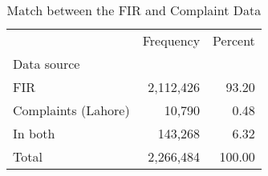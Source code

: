 \begin{table}[!h]
\caption{Match between the FIR and Complaint Data}
\centering
\begin{tabular}{lll}
\cline{1-3}
\multicolumn{1}{c}{} &
  \multicolumn{1}{|r}{Frequency} &
  \multicolumn{1}{r}{Percent} \\
\cline{1-3}
\multicolumn{1}{l}{Data source} &
  \multicolumn{1}{|r}{} &
  \multicolumn{1}{r}{} \\
\multicolumn{1}{l}{\hspace{1em}FIR} &
  \multicolumn{1}{|r}{2,112,426} &
  \multicolumn{1}{r}{93.20} \\
\multicolumn{1}{l}{\hspace{1em}Complaints (Lahore)} &
  \multicolumn{1}{|r}{10,790} &
  \multicolumn{1}{r}{0.48} \\
\multicolumn{1}{l}{\hspace{1em}In both} &
  \multicolumn{1}{|r}{143,268} &
  \multicolumn{1}{r}{6.32} \\
\multicolumn{1}{l}{\hspace{1em}Total} &
  \multicolumn{1}{|r}{2,266,484} &
  \multicolumn{1}{r}{100.00} \\
\cline{1-3}
\end{tabular}
\end{table}
